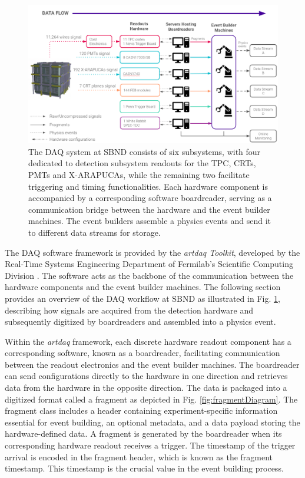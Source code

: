 \begin{figure}[htbp!] 
\centering    
\includegraphics[width=1.0\textwidth]{DAQ_Overview}
\caption[DAQOverview]{
The DAQ system at SBND consists of six subsystems, with four dedicated to detection subsystem readouts for the TPC, CRTs, PMTs and X-ARAPUCAs, while the remaining two facilitate triggering and timing functionalities.
Each hardware component is accompanied by a corresponding software boardreader, serving as a communication bridge between the hardware and the event builder machines.
The event builders assemble a physics events and send it to different data streams for storage.
}
\label{fig:daqOverview}
\end{figure}

The DAQ software framework is provided by the \textit{artdaq Toolkit}, developed by the Real-Time Systems Engineering Department of Fermilab's Scientific Computing Division \cite{artdaq_note}.
The software acts as the backbone of the communication between the hardware components and the event builder machines.
The following section provides an overview of the DAQ workflow at SBND as illustrated in Fig. \ref{fig:daqOverview}, describing how signals are acquired from the detection hardware and subsequently digitized by boardreaders and assembled into a physics event.

Within the \textit{artdaq} framework, each discrete hardware readout component has a corresponding software, known as a boardreader, facilitating communication between the readout electronics and the event builder machines.
The boardreader can send configurations directly to the hardware in one direction and retrieves data from the hardware in the opposite direction.
The data is packaged into a digitized format called a fragment as depicted in Fig. \ref{fig:fragmentDiagram}. 
The fragment class includes a header containing experiment-specific information essential for event building, an optional metadata, and a data payload storing the hardware-defined data.
A fragment is generated by the boardreader when its corresponding hardware readout receives a trigger.
The timestamp of the trigger arrival is encoded in the fragment header, which is known as the fragment timestamp.
This timestamp is the crucial value in the event building process.

